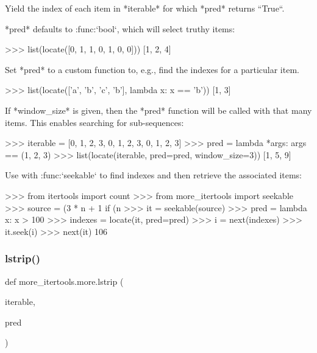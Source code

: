 \begin{DoxyVerb}Yield the index of each item in *iterable* for which *pred* returns
``True``.

*pred* defaults to :func:`bool`, which will select truthy items:

    >>> list(locate([0, 1, 1, 0, 1, 0, 0]))
    [1, 2, 4]

Set *pred* to a custom function to, e.g., find the indexes for a particular
item.

    >>> list(locate(['a', 'b', 'c', 'b'], lambda x: x == 'b'))
    [1, 3]

If *window_size* is given, then the *pred* function will be called with
that many items. This enables searching for sub-sequences:

    >>> iterable = [0, 1, 2, 3, 0, 1, 2, 3, 0, 1, 2, 3]
    >>> pred = lambda *args: args == (1, 2, 3)
    >>> list(locate(iterable, pred=pred, window_size=3))
    [1, 5, 9]

Use with :func:`seekable` to find indexes and then retrieve the associated
items:

    >>> from itertools import count
    >>> from more_itertools import seekable
    >>> source = (3 * n + 1 if (n %
    >>> it = seekable(source)
    >>> pred = lambda x: x > 100
    >>> indexes = locate(it, pred=pred)
    >>> i = next(indexes)
    >>> it.seek(i)
    >>> next(it)
    106\end{DoxyVerb}
 \mbox{\label{namespacemore__itertools_1_1more_a1c0c8a99ae094fa00eea3f0e9726d4f7}} 
\subsubsection{\texorpdfstring{lstrip()}{lstrip()}}
{\footnotesize\ttfamily def more\+\_\+itertools.\+more.\+lstrip (\begin{DoxyParamCaption}\item[{}]{iterable,  }\item[{}]{pred }\end{DoxyParamCaption})}

